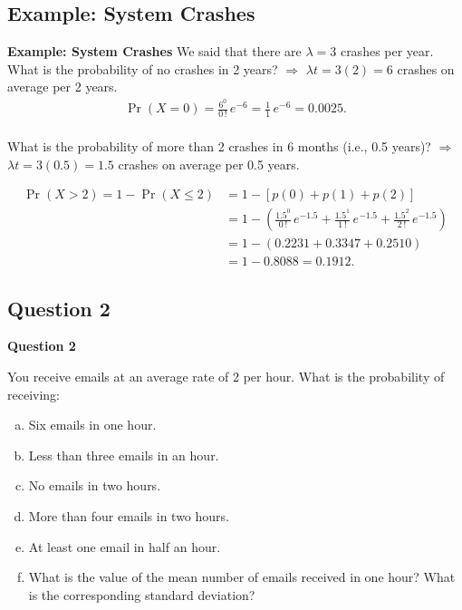 \documentclass[compress]{beamer}        %
\makeatletter
\newcommand{\tcb}{\textcolor{beamer@blendedblue}}
\makeatother
\begin{document}
\subsection{Example: System Crashes}
\begin{frame}{\bf \tcb{Example: System Crashes}}
We said that there are $\lambda = 3$ crashes per year.\\[0.4cm]

What is the probability of no crashes in 2 years? $\Rightarrow$ $\lambda t = 3(2) = 6$ crashes on average per 2 years.
\begin{align*}
\Pr(X=0) = \frac{6^0}{0\,!}\,e^{-6} = \frac{1}{1}\,e^{-6} = 0.0025.\\[-0.2cm]
\end{align*}

What is the probability of more than 2 crashes in 6 months (i.e., 0.5 years)? $\Rightarrow$ $\lambda t = 3(0.5) = 1.5$ crashes on average per 0.5 years.\vspace{-0.3cm}
\begin{adjustwidth}{-0.1cm}{0cm}
\begin{align*}
\Pr(X > 2) = 1 - \Pr(X\le2) &= 1-[p(0) + p(1) + p(2)]\\
&=  1 - \left(\frac{1.5^0}{0\,!}\,e^{-1.5} + \frac{1.5^1}{1\,!}\,e^{-1.5} + \frac{1.5^2}{2\,!}\,e^{-1.5}\right)\\
&= 1 - (0.2231 + 0.3347 + 0.2510) \\
&= 1 - 0.8088 = 0.1912.
\end{align*}
\end{adjustwidth}

\end{frame}


\subsection{Question 2}
\begin{frame}{\bf \tcb{Question 2}}

You receive emails at an average rate of 2 per hour. What is the probability of receiving:\\[0.2cm]

\begin{enumerate}[a)]\itemsep0.2cm
\item Six emails in one hour.
\item Less than three emails in an hour.
\item No emails in two hours.
\item More than four emails in two hours.
\item At least one email in half an hour.
\item What is the value of the mean number of emails received in one hour? What is the corresponding standard deviation?
\end{enumerate}


\end{frame}
\end{document}
